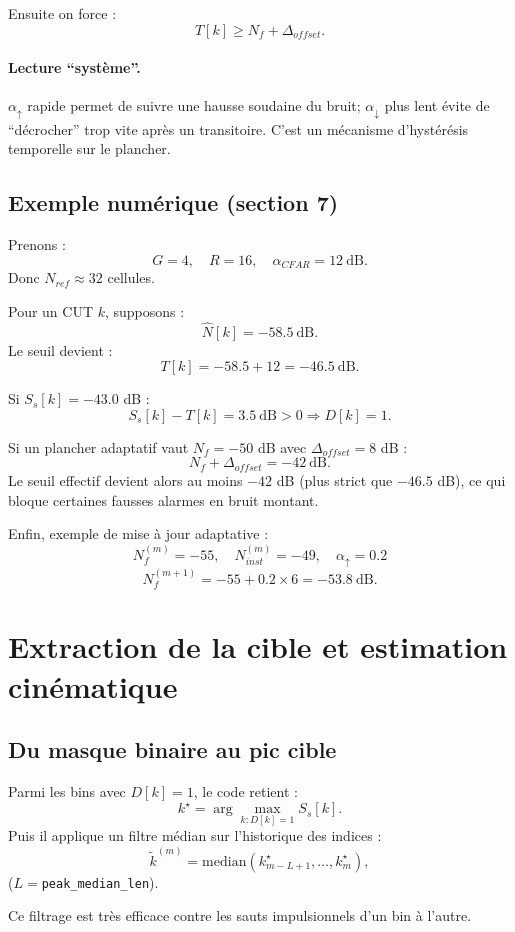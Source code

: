 \documentclass[a4paper,11pt]{article}
\begin{document}
Ensuite on force :
\[
T[k]\ge N_f+\Delta_{offset}.
\]

\paragraph{Lecture ``syst\`eme''.}
\(\alpha_{\uparrow}\) rapide permet de suivre une hausse soudaine du bruit; \(\alpha_{\downarrow}\) plus lent \'evite de ``d\'ecrocher'' trop vite apr\`es un transitoire. C'est un m\'ecanisme d'hyst\'er\'esis temporelle sur le plancher.

\subsection{Exemple num\'erique (section 7)}

Prenons :
\[
G=4,\quad R=16,\quad \alpha_{CFAR}=12\ \text{dB}.
\]
Donc \(N_{ref}\approx 32\) cellules.

Pour un CUT \(k\), supposons :
\[
\widehat{N}[k]=-58.5\ \text{dB}.
\]
Le seuil devient :
\[
T[k]=-58.5+12=-46.5\ \text{dB}.
\]

Si \(S_s[k]=-43.0\) dB :
\[
S_s[k]-T[k]=3.5\ \text{dB}>0\Rightarrow D[k]=1.
\]

Si un plancher adaptatif vaut \(N_f=-50\) dB avec \(\Delta_{offset}=8\) dB :
\[
N_f+\Delta_{offset}=-42\ \text{dB}.
\]
Le seuil effectif devient alors au moins \(-42\) dB (plus strict que \(-46.5\) dB), ce qui bloque certaines fausses alarmes en bruit montant.

Enfin, exemple de mise \`a jour adaptative :
\[
N_f^{(m)}=-55,\quad N_{inst}^{(m)}=-49,\quad \alpha_{\uparrow}=0.2
\]
\[
N_f^{(m+1)}=-55+0.2\times 6 = -53.8\ \text{dB}.
\]

\section{Extraction de la cible et estimation cin\'ematique}

\subsection{Du masque binaire au pic cible}

Parmi les bins avec \(D[k]=1\), le code retient :
\[
k^\star = \arg\max_{k: D[k]=1} S_s[k].
\]
Puis il applique un filtre m\'edian sur l'historique des indices :
\[
\tilde{k}^{(m)}=\mathrm{median}\!\left(k^\star_{m-L+1},\dots,k^\star_m\right),
\]
(\(L=\)\texttt{peak\_median\_len}).

Ce filtrage est tr\`es efficace contre les sauts impulsionnels d'un bin \`a l'autre.
\end{document}
